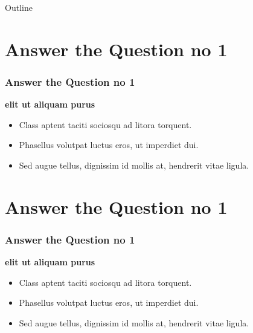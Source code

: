 \documentclass{beamer}
\begin{document}
\begin{frame}{Outline}
  \tableofcontents
\end{frame}

\section{Answer the Question no 1}
\begin{frame}[fragile]
\frametitle{ Answer the Question no 1}
\flushleft
\textbf{elit ut aliquam purus}
\begin{itemize}
    \item Class aptent taciti sociosqu ad litora torquent.
    \item Phasellus volutpat luctus eros, ut imperdiet dui.
    \item Sed augue tellus, dignissim id mollis at, hendrerit vitae ligula.
\end{itemize}
\end{frame}

\section{Answer the Question no 1}
\begin{frame}[fragile]
\frametitle{ Answer the Question no 1}
\flushleft
\textbf{elit ut aliquam purus}
\begin{itemize}
    \item Class aptent taciti sociosqu ad litora torquent.
    \item Phasellus volutpat luctus eros, ut imperdiet dui.
    \item Sed augue tellus, dignissim id mollis at, hendrerit vitae ligula.
\end{itemize}
\end{frame}
\end{document}
